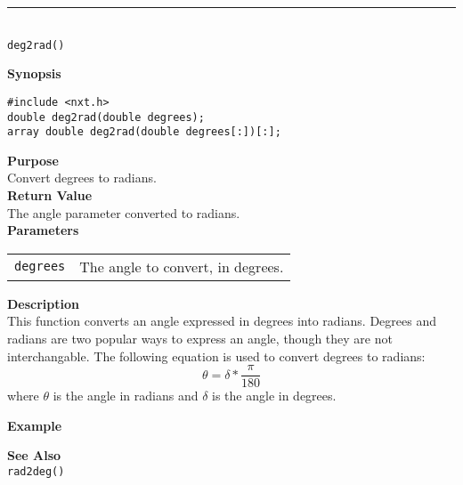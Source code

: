 \noindent
\vspace{5pt}
\rule{4.5in}{0.015in}\\
\noindent
{\LARGE \texttt{deg2rad()}}\\
{}

\noindent
{\bf Synopsis}
\vspace{-8pt}
\begin{verbatim}
#include <nxt.h>
double deg2rad(double degrees);
array double deg2rad(double degrees[:])[:];
\end{verbatim}

\noindent
{\bf Purpose}\\
Convert degrees to radians.\\

\noindent
{\bf Return Value}\\
The angle parameter converted to radians.\\

\noindent
{\bf Parameters}
\vspace{-0.1in}
\begin{description}
\item               
\begin{tabular}{p{15 mm}p{145 mm}}
\texttt{degrees} & The angle to convert, in degrees. \\
\end{tabular}
\end{description}

\noindent
{\bf Description}\\
This function converts an angle expressed in degrees into radians. Degrees and
radians are two popular ways to express an angle, though they are not interchangable.
The following equation is used to convert degrees to radians:
\begin{equation*}
\theta = \delta * \frac{\pi}{180}
\end{equation*}
where $\theta$ is the angle in radians and $\delta$ is the angle in degrees.

\noindent
{\bf Example}\\
\noindent

\noindent
{\bf See Also}\\
\texttt{rad2deg()}

